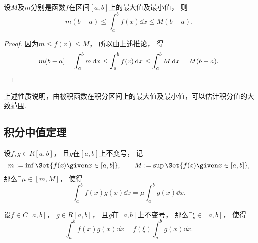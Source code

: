 \begin{property}\label{theorem:定积分.定积分性质6}
设\(M\)及\(m\)分别是函数\(f\)在区间\([a,b]\)上的最大值及最小值，
则\[
	m(b-a) \leq \int_a^b f(x) \dd{x} \leq M(b-a).
\]
\begin{proof}
因为\(m \leq f(x) \leq M\)，
所以由上述推论，
得\[
	m(b-a)
	= \int_a^b m \dd{x}
	\leq \int_a^b f(x) \dd{x}
	\leq \int_a^b M \dd{x}
	= M(b-a).
	\qedhere
\]
\end{proof}
\end{property}
上述性质说明，由被积函数在积分区间上的最大值及最小值，可以估计积分值的大致范围.

\subsection{积分中值定理}
\begin{theorem}[积分第一中值定理]\label{theorem:定积分.积分中值定理1}
设\(f,g \in R[a,b]\)，
且\(g\)在\([a,b]\)上不变号，
记\[
	m \defeq \inf\Set{ f(x) \given x \in [a,b] }, \qquad
	M \defeq \sup\Set{ f(x) \given x \in [a,b] },
\]
那么\(\exists\mu\in[m,M]\)，
使得\begin{equation}
	\int_a^b f(x) g(x) \dd{x} = \mu \int_a^b g(x) \dd{x}.
\end{equation}
\end{theorem}

\begin{corollary}\label{theorem:定积分.积分中值定理1推论1}
设\(f \in C[a,b]\)，
\(g \in R[a,b]\)，
且\(g\)在\([a,b]\)上不变号，
那么\(\exists\xi\in[a,b]\)，
使得\begin{equation}
	\int_a^b f(x) g(x) \dd{x}
	= f(\xi) \int_a^b g(x) \dd{x}.
\end{equation}
\end{corollary}

\begin{figure}[htb]
	\centering
	\caption{}
	\label{figure:定积分.积分中值定理的几何意义}
\end{figure}

